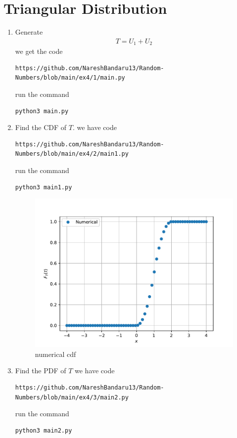 \documentclass[journal,12pt,twocolumn]{IEEEtran}
\renewcommand\thesection{\arabic{section}}
\begin{document}
\section{Triangular Distribution}
\begin{enumerate}[label=\thesection.\arabic*
,ref=\thesection.\theenumi]
%
\item Generate 
	\begin{align}
		T = U_1+U_2
	\end{align}
we get the code
\begin{lstlisting}
https://github.com/NareshBandaru13/Random-Numbers/blob/main/ex4/1/main.py
\end{lstlisting}
run the command
\begin{lstlisting}
python3 main.py
\end{lstlisting}

\item Find the CDF of $T$.
we have code
\begin{lstlisting}
https://github.com/NareshBandaru13/Random-Numbers/blob/main/ex4/2/main1.py
\end{lstlisting}
run the command
\begin{lstlisting}
python3 main1.py
\end{lstlisting}
\begin{figure}[H]
    \centering
    \includegraphics[scale = 0.5]{t1.pdf}
    \caption{numerical cdf}
    \label{fig:my_cdf1}
\end{figure}

\item Find the PDF of $T$
we have code
\begin{lstlisting}
https://github.com/NareshBandaru13/Random-Numbers/blob/main/ex4/3/main2.py
\end{lstlisting}
run the command
\begin{lstlisting}
python3 main2.py
\end{lstlisting}


\end{enumerate}
\end{document}
